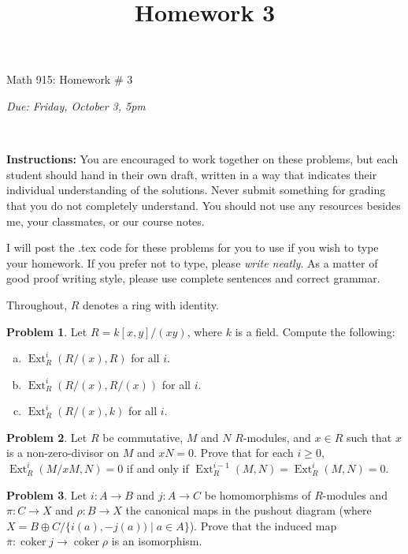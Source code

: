 \documentclass[11pt]{article}
\title{}
\date{\vspace{-0.5in}}
\title{Homework 3}
\theoremstyle{definition}
\newtheorem{problem}{Problem}
\newcommand{\Ext}{\operatorname{Ext}}
\newcommand{\coker}{\operatorname{coker}}
\begin{document}
\vspace{3em}

\begin{center}
	{\LARGE Math 915: Homework \# 3}
\end{center}
\begin{center}
{\it Due:  Friday, October 3, 5pm}
\end{center}

\

\noindent
{\bf Instructions:}
You are encouraged to work together on these problems, but each student should hand in their own draft, written in a way that indicates their individual understanding of the solutions. Never submit something for grading that you do not completely understand. You should not use any resources besides me, your classmates, or our course notes.

\medskip
\noindent
I will post the .tex code for these problems for you to use if you wish to type your homework. If you prefer not to type, please  {\em write neatly}. As a matter of good proof writing style, please use complete sentences and correct grammar. 


\medskip
\noindent
Throughout, $R$ denotes a ring with identity.

\medskip

\begin{problem} Let $R=k[x,y]/(xy)$, where $k$ is a field.   Compute the following:
\begin{enumerate}[(a)]
\item $\Ext^i_R(R/(x),R)$ for all $i$.
\item $\Ext^i_R(R/(x),R/(x))$ for all $i$.
\item $\Ext^i_R(R/(x),k)$ for all $i$.
\end{enumerate}
\end{problem}

\begin{problem} Let $R$ be commutative, $M$ and $N$ $R$-modules, and $x\in R$ such that $x$ is a non-zero-divisor on $M$ and $xN=0$.   Prove that for each $i\ge 0$, $\Ext^i_R(M/xM,N)=0$ if and only if $\Ext^{i-1}_R(M,N)=\Ext^i_R(M,N)=0$.
\end{problem}

\begin{problem} Let $i:A\to B$ and $j:A\to C$ be homomorphisms of $R$-modules and $\pi:C\to X$ and $\rho:B\to X$ the canonical maps in the pushout diagram (where $X=B\oplus C/\{i(a),-j(a))\mid a\in A\}$).  Prove that the induced map $\overline{\pi}:\coker j\to \coker \rho$  is an isomorphism.
\end{problem}
\end{document}
